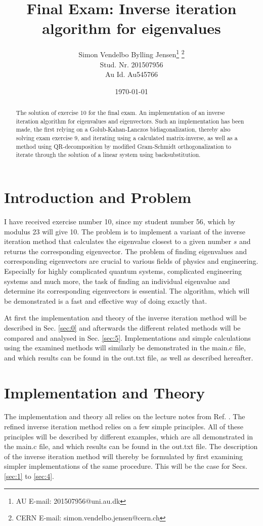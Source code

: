 \documentclass[twocolumn]{article}
\begin{document}
\title{Final Exam: Inverse iteration algorithm for eigenvalues}
\author{Simon Vendelbo Bylling Jensen\thanks{AU E-mail: 201507956@uni.au.dk} \thanks{CERN E-mail: simon.vendelbo.jensen@cern.ch}\\
Stud. Nr. 201507956 \\
Au Id. Au545766}
\date{\today}
\maketitle

\begin{abstract}
The  solution of exercise 10 for the final exam. An implementation of an inverse iteration algorithm for eigenvalues and eigenvectors. Such an implementation has been made, the first relying on a Golub-Kahan-Lanczos bidiagonalization, thereby also solving exam exercise 9, and   iterating using a calculated matrix-inverse, as well as a method using QR-decomposition by modified Gram-Schmidt orthogonalization to iterate through the solution of a linear system using backsubstitution.
\end{abstract}

\section*{Introduction and Problem}
I have received exercise number 10, since my student number 56, which by modulus 23 will give 10. The problem is to implement a variant of the inverse iteration method that calculates the eigenvalue closest to a given number $s$ and returns the corresponding eigenvector. The problem of finding eigenvalues and corresponding eigenvectors are crucial to various fields of physics and engineering. Especially for highly complicated quantum systems, complicated engineering systems and much more, the task of finding an individual eigenvalue and determine its corresponding eigenvectors is essential. The algorithm, which will be demonstrated is a fast and effective way of doing exactly that.

At first the implementation and theory of the inverse iteration method will be described in Sec. \ref{sec:0} and afterwards the different related methods will be compared and analysed in Sec. \ref{sec:5}. Implementations and simple calculations using the examined methods will similarly be demonstrated in the main.c file, and which results can be found in the out.txt file, as well as described hereafter.

\section{\label{sec:0}Implementation and Theory}
The implementation and theory all relies on the lecture notes from Ref. \cite[Chapter 12 - Eigenvalues 2: Power methods and Krylov subspace methods]{Dmi}. The refined inverse iteration method relies on a few simple principles. All of these principles will be described by different examples, which are all demonstrated in the main.c file, and which results can be found in the out.txt file. The description of the inverse iteration method will thereby be formulated by first examining simpler implementations of the same procedure. This will be the case for Secs. \ref{sec:1} to \ref{sec:4}.
\end{document}
